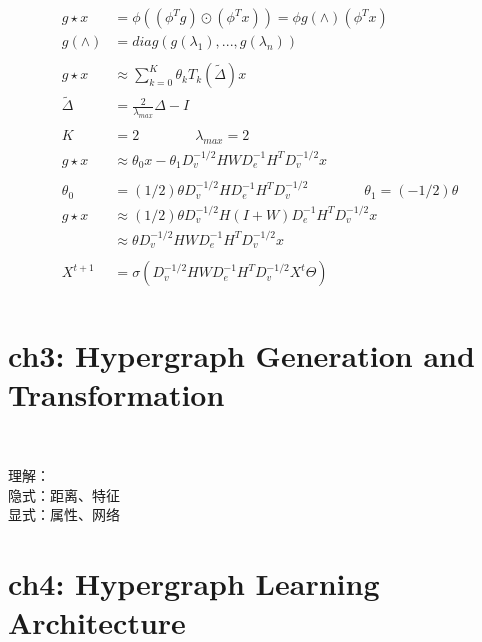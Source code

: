 \documentclass{article}
\begin{document}
\newpage
\begin{align*}
    ~ \\[3pt]
    g \star x &= \phi ( (\phi^{T} g) \odot (\phi^{T} x) ) 
              = \phi g(\wedge) (\phi^{T} x)  \\[3pt]
    g(\wedge) &= diag( g(\lambda_{1}), ..., g(\lambda_{n}) )  \\[3pt]
    ~ \\[3pt]
    g \star x & \approx \sum_{k=0}^{K} \theta_{k} T_{k} ( \tilde{\Delta} ) x  \\[3pt]
    \tilde{\Delta} & = \frac{2}{\lambda_{max}} \Delta - I  \\[3pt]
    ~ \\[3pt]
    K & = 2  \qquad \qquad \lambda_{max} = 2  \\[3pt]
    g \star x & \approx \theta_{0}x - \theta_{1} 
        D_{v}^{-1/2} H W D_{e}^{-1} H^{T} D_{v}^{-1/2} x  \\[3pt]
    ~ \\[3pt]
    \theta_{0} &= (1/2) \theta D_{v}^{-1/2} H D_{e}^{-1} H^{T} D_{v}^{-1/2} \qquad \qquad 
    \theta_{1} = (-1/2) \theta  \\[3pt]
    g \star x & \approx (1/2) \theta D_{v}^{-1/2} H (I+W) D_{e}^{-1} H^{T} D_{v}^{-1/2} x  \\[3pt]
              & \approx \theta D_{v}^{-1/2} H W D_{e}^{-1} H^{T} D_{v}^{-1/2} x  \\[3pt]
    ~ \\[3pt]
    X^{t+1} &= \sigma ( D_{v}^{-1/2} H W D_{e}^{-1} H^{T} D_{v}^{-1/2} X^{t} \varTheta )  \\[3pt]
\end{align*}


\newpage
\section*{ch3: Hypergraph Generation and Transformation}


~ \\[3pt]
\begin{CJK}{UTF8}{gbsn}
    理解： \\[3pt]
        隐式：距离、特征  \\[3pt]
        显式：属性、网络  \\[3pt]
\end{CJK}


\newpage
\section*{ch4: Hypergraph Learning Architecture}
\end{document}
